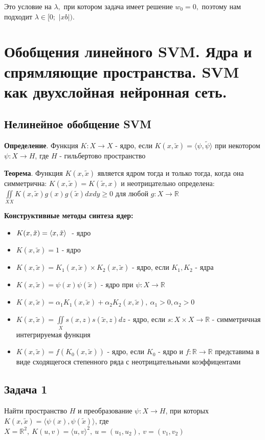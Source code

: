Это условие на $\lambda,$ при котором задача имеет решение $w_0 = 0,$ поэтому нам подходит $\lambda \in [0;$ $|xb|)$.

\section{Обобщения линейного SVM. Ядра и спрямляющие пространства. SVM как двухслойная нейронная сеть.}
\subsection*{Нелинейное обобщение SVM}
\textbf{Определение}. Функция $K: X \rightarrow X$ - ядро, если $K(x, \tilde{x}) = \langle \psi, \tilde{\psi} \rangle $ при некотором $\psi: X \rightarrow H$, где $H$ - гильбертово пространство

\noindent\textbf{Теорема}. Функция $K(x, \tilde{x})$ является ядром тогда и только тогда, когда
она симметрична: $K(x, \tilde{x}) = K(\tilde{x}, x)$ и неотрицательно определена:
$ \iint\limits_{XX} K(x, \tilde{x})g(x)g(\tilde{x}) dxdy \ge 0$ для любой $g: X \rightarrow \mathbb{R}$

\noindent\textbf{Конструктивные методы синтеза ядер:}
\begin{itemize}
  \item $K(x, \tilde{x}) = \text{\textlangle} x, \tilde{x} \text{\textrangle} ~$ - ядро
  \item $K(x, \tilde{x}) = 1$ - ядро
  \item $K(x, \tilde{x}) = K_1(x, \tilde{x}) \times K_2(x, \tilde{x})$ - ядро, если $K_1, K_2$ - ядра
  \item $K(x, \tilde{x}) = \psi(x)\psi(\tilde{x})$ - ядро при $\psi: X \rightarrow \mathbb{R}$
  \item $K(x, \tilde{x}) = \alpha_1 K_1(x, \tilde{x}) + \alpha_2 K_2(x, \tilde{x}), ~ \alpha_1 > 0, \alpha_2 > 0$
  \item $K(x ,\tilde{x}) = \iint\limits_{X} s(x, z) s(\tilde{x}, z) dz$ - ядро, если $s: X \times X \rightarrow \mathbb{R}$ - симметричная интегрируемая функция
  \item $K(x, \tilde{x}) = f(K_0(x, \tilde{x}))$ - ядро, если $K_0$ - ядро и $f: \mathbb{R} \rightarrow \mathbb{R}$ представима в виде сходящегося степенного ряда с неотрицательными коэффицентами 
\end{itemize}

\subsection{Задача 1}
Найти пространство $H$ и преобразование $\psi: X \rightarrow H$, при которых 
$K(x, \tilde{x}) = \langle \psi(x),\psi(\tilde{x}) \rangle $, где $X = \mathbb{R}^2,~
K(u, v) = \langle u, v \rangle^2,~ u = (u_1, u_2),~ v = (v_1, v_2)$
